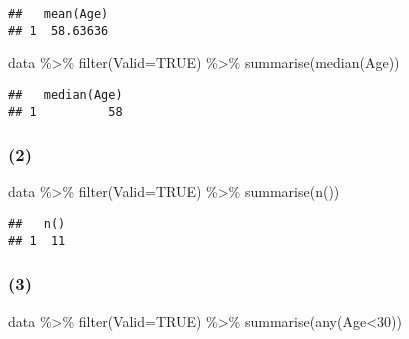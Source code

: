 \documentclass[
]{article}
\newenvironment{Shaded}{\begin{snugshade}}{\end{snugshade}}
\newcommand{\AttributeTok}[1]{\textcolor[rgb]{0.77,0.63,0.00}{#1}}
\newcommand{\ConstantTok}[1]{\textcolor[rgb]{0.00,0.00,0.00}{#1}}
\newcommand{\DecValTok}[1]{\textcolor[rgb]{0.00,0.00,0.81}{#1}}
\newcommand{\FunctionTok}[1]{\textcolor[rgb]{0.00,0.00,0.00}{#1}}
\newcommand{\NormalTok}[1]{#1}
\newcommand{\SpecialCharTok}[1]{\textcolor[rgb]{0.00,0.00,0.00}{#1}}
\begin{document}
\begin{verbatim}
##   mean(Age)
## 1  58.63636
\end{verbatim}

\begin{Shaded}
\begin{Highlighting}[]
\NormalTok{data }\SpecialCharTok{\%\textgreater{}\%} \FunctionTok{filter}\NormalTok{(}\AttributeTok{Valid=}\ConstantTok{TRUE}\NormalTok{) }\SpecialCharTok{\%\textgreater{}\%} \FunctionTok{summarise}\NormalTok{(}\FunctionTok{median}\NormalTok{(Age))}
\end{Highlighting}
\end{Shaded}

\begin{verbatim}
##   median(Age)
## 1          58
\end{verbatim}

\hypertarget{section-9}{%
\subsubsection{(2)}\label{section-9}}

\begin{Shaded}
\begin{Highlighting}[]
\NormalTok{data }\SpecialCharTok{\%\textgreater{}\%} \FunctionTok{filter}\NormalTok{(}\AttributeTok{Valid=}\ConstantTok{TRUE}\NormalTok{) }\SpecialCharTok{\%\textgreater{}\%} \FunctionTok{summarise}\NormalTok{(}\FunctionTok{n}\NormalTok{())}
\end{Highlighting}
\end{Shaded}

\begin{verbatim}
##   n()
## 1  11
\end{verbatim}

\hypertarget{section-10}{%
\subsubsection{(3)}\label{section-10}}

\begin{Shaded}
\begin{Highlighting}[]
\NormalTok{data }\SpecialCharTok{\%\textgreater{}\%} \FunctionTok{filter}\NormalTok{(}\AttributeTok{Valid=}\ConstantTok{TRUE}\NormalTok{) }\SpecialCharTok{\%\textgreater{}\%} \FunctionTok{summarise}\NormalTok{(}\FunctionTok{any}\NormalTok{(Age}\SpecialCharTok{\textless{}}\DecValTok{30}\NormalTok{)) }
\end{Highlighting}
\end{Shaded}
\end{document}

